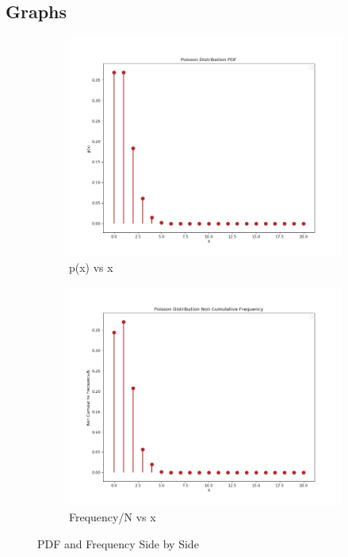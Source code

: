 \documentclass[12pt]{article}
\begin{document}
\subsection{Graphs}

\begin{figure}[H]
	\centering
	\begin{subfigure}{.5\textwidth}
		\centering
		\includegraphics[scale=0.35]{Figures/pdf.png}
		\caption{p(x) vs x}
		\label{fig:px}
	\end{subfigure}%
	\begin{subfigure}{.5\textwidth}
		\centering
		\includegraphics[scale=0.35]{Figures/noncumfreq.png}
		\caption{Frequency/N vs x}
		\label{fig:freq}
	\end{subfigure}
	\caption{PDF and Frequency Side by Side}
	\label{fig:test}
\end{figure}
\end{document}
